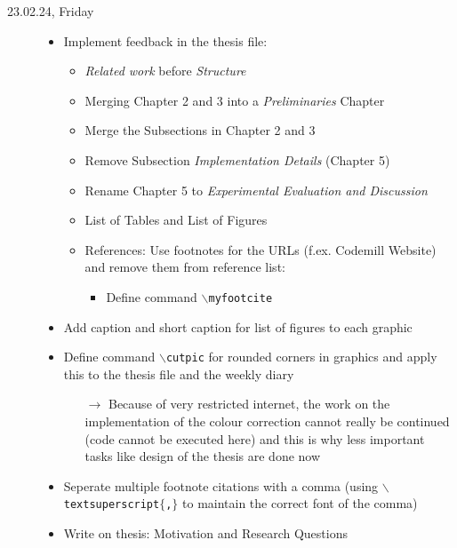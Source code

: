 \documentclass[a4, 11pt]{scrartcl}
\begin{document}
\begin{description}
	\item[23.02.24, Friday]
	\begin{itemize}
		\item[]
		\item Implement feedback in the  thesis file:
		\begin{itemize}
			\item \textit{Related work} before \textit{Structure}
			\item Merging Chapter 2 and 3 into a \textit{Preliminaries} Chapter
			\item Merge the Subsections in Chapter 2 and 3
			\item Remove Subsection \textit{Implementation Details} (Chapter 5)
			\item Rename Chapter 5 to \textit{Experimental Evaluation and Discussion}
			\item List of Tables and List of Figures
			\item References: Use footnotes for the URLs (f.ex. Codemill Website) and remove them from reference list:
			\begin{itemize}
				\item Define command \texttt{$\backslash$myfootcite}
			\end{itemize}
		\end{itemize}
		\item Add caption and short caption for list of figures to each graphic
		\item Define command \texttt{$\backslash$cutpic} for rounded corners in graphics and apply this to the thesis file and the weekly diary
		\begin{itemize}
			\item[$\rightarrow$] Because of very restricted internet, the work on the implementation of the colour correction cannot really be continued (code cannot be executed here) and this is why less important tasks like design of the thesis are done now
		\end{itemize}
		\item Seperate multiple footnote citations with a comma (using \texttt{$\backslash$textsuperscript$\{$,$\}$} to maintain the correct font of the comma)
		\item Write on thesis: Motivation and Research Questions
	\end{itemize}

\end{description}	
\end{document}
